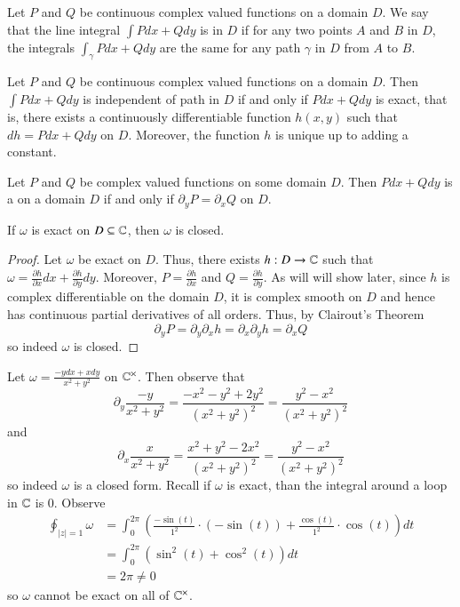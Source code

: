 \begin{definition}
    Let $P$ and $Q$ be continuous complex valued functions on a domain $D$. We say that the line integral $\int Pdx+Qdy$ is  in $D$ if for any two points $A$ and $B$ in $D$, the integrals $\int_{\gamma}Pdx+Qdy$ are the same for any path $\gamma$ in $D$ from $A$ to $B$.
\end{definition}

\begin{lemma}
    Let $P$ and $Q$ be continuous complex valued functions on a domain $D$. Then $\int Pdx+Qdy$ is independent of path in $D$ if and only if $Pdx+Qdy$ is exact, that is, there exists a continuously differentiable function $h(x,y)$ such that $dh = Pdx+Qdy$ on $D$. Moreover, the function $h$ is unique up to adding a constant.
\end{lemma}



\begin{definition}
    Let $P$ and $Q$ be complex valued functions on some domain $D$. Then $Pdx+Qdy$ is a  on a domain $D$ if and only if $\partial_yP = \partial_xQ$ on $D$.
\end{definition}

\begin{proposition}
    If $\omega$ is exact on $D \subseteq \mathbb C$, then $\omega$ is closed.
\end{proposition}
\begin{proof}
    Let $\omega$ be exact on $D$. Thus, there exists $h:D\rightarrow \mathbb C$ such that $\omega = \frac{\partial h}{\partial x}dx+\frac{\partial h}{\partial y}dy$. Moreover, $P = \frac{\partial h}{\partial x}$ and $Q = \frac{\partial h}{\partial y}$. As will will show later, since $h$ is complex differentiable on the domain $D$, it is complex smooth on $D$ and hence has continuous partial derivatives of all orders. Thus, by Clairout's Theorem $$\partial_yP = \partial_y \partial_xh = \partial_x\partial_yh = \partial_xQ$$
    so indeed $\omega$ is closed.
\end{proof}


\begin{example}
    Let $\omega = \frac{-ydx + xdy}{x^2+y^2}$ on $\mathbb C^{\times}$. Then observe that $$\partial_y\frac{-y}{x^2+y^2} = \frac{-x^2-y^2 + 2y^2}{(x^2+y^2)^2} = \frac{y^2-x^2}{(x^2+y^2)^2}$$ and $$\partial_x\frac{x}{x^2+y^2} = \frac{x^2+y^2 - 2x^2}{(x^2+y^2)^2} = \frac{y^2-x^2}{(x^2+y^2)^2}$$
    so indeed $\omega$ is a closed form. Recall if $\omega$ is exact, than the integral around a loop in $\mathbb C$ is $0$. Observe \begin{align*}
        \oint_{|z|=1}\omega &= \int_{0}^{2\pi}\left(\frac{-\sin(t)}{1^2}\cdot (-\sin(t))+\frac{\cos(t)}{1^2}\cdot \cos(t)\right)dt \\
        &= \int_{0}^{2\pi}(\sin^2(t)+\cos^2(t))dt \\
        &= 2\pi \neq 0
    \end{align*}
    so $\omega$ cannot be exact on all of $\mathbb C^{\times}$.
\end{example}


